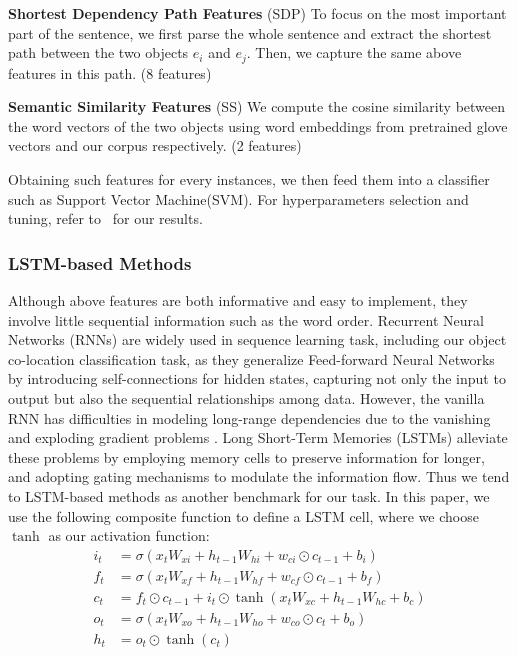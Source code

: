 \textbf{Shortest Dependency Path Features} (SDP) To focus on the most important part of the sentence, we first parse the whole sentence and extract the shortest path between the two objects $e_i$ and $e_j$. Then, we capture the same above features in this path. (8 features)

\textbf{Semantic Similarity Features} (SS) We compute the cosine similarity between the word vectors of the two objects using word embeddings from pretrained glove vectors and our corpus respectively. (2 features)

Obtaining such features for every instances, we then feed them into a classifier such as Support Vector Machine(SVM). For hyperparameters selection and tuning, refer to~ for our results.

\subsubsection{LSTM-based Methods}
Although above features are both informative and easy to implement, they involve little sequential information such as the word order.
Recurrent Neural Networks (RNNs) are widely used in sequence learning task, 
including our object co-location classification task, 
as they generalize Feed-forward Neural Networks by 
introducing self-connections for hidden states, 
capturing not only the input to output but also the sequential 
relationships among data.
However, the vanilla RNN has difficulties in modeling long-range 
dependencies due to the vanishing and exploding gradient 
problems \cite{bengio1994learning}.
Long Short-Term Memories (LSTMs) \cite{hochreiter1997long} 
alleviate these problems by employing memory cells to preserve information 
for longer, and adopting gating mechanisms to modulate the 
information flow. Thus we tend to LSTM-based methods as 
another benchmark for our task. In this paper, we use the 
following composite function to define a LSTM cell, 
where we choose $\tanh$ as our activation function:
\begin{equation*}
	\begin{split}i_t &= \sigma(x_t W_{xi} + h_{t-1} W_{hi}
	+ w_{ci} \odot c_{t-1} + b_i)\\
	f_t &= \sigma(x_t W_{xf} + h_{t-1} W_{hf}
	+ w_{cf} \odot c_{t-1} + b_f)\\
	c_t &= f_t \odot c_{t - 1}
	+ i_t \odot \tanh(x_t W_{xc} + h_{t-1} W_{hc} + b_c)\\
	o_t &= \sigma(x_t W_{xo} + h_{t-1} W_{ho} + w_{co} \odot c_t + b_o)\\
	h_t &= o_t \odot \tanh(c_t)\end{split}
\end{equation*}
